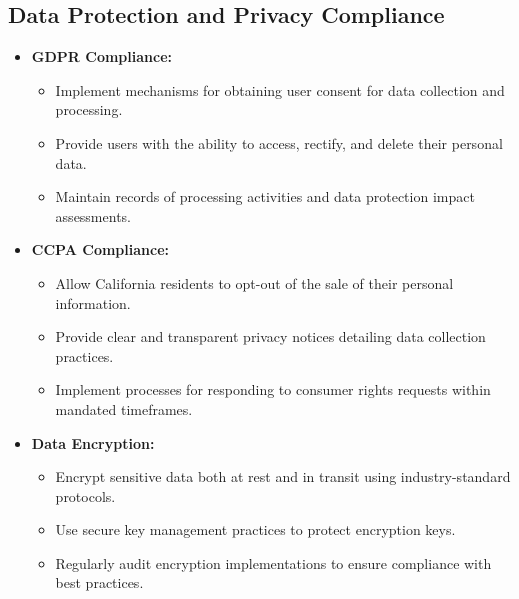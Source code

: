 \subsection{Data Protection and Privacy Compliance}
\begin{itemize}[leftmargin=*]
    \item \textbf{GDPR Compliance:}
    \begin{itemize}
        \item Implement mechanisms for obtaining user consent for data collection and processing.
        \item Provide users with the ability to access, rectify, and delete their personal data.
        \item Maintain records of processing activities and data protection impact assessments.
    \end{itemize}
    
    \item \textbf{CCPA Compliance:}
    \begin{itemize}
        \item Allow California residents to opt-out of the sale of their personal information.
        \item Provide clear and transparent privacy notices detailing data collection practices.
        \item Implement processes for responding to consumer rights requests within mandated timeframes.
    \end{itemize}
    
    \item \textbf{Data Encryption:}
    \begin{itemize}
        \item Encrypt sensitive data both at rest and in transit using industry-standard protocols.
        \item Use secure key management practices to protect encryption keys.
        \item Regularly audit encryption implementations to ensure compliance with best practices.
    \end{itemize}
\end{itemize}

